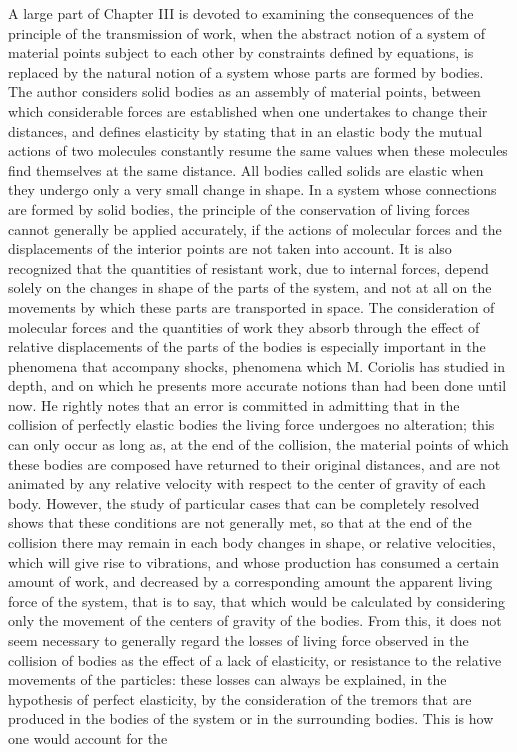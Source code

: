 \documentclass{book}
\begin{document}
A large part of Chapter III is devoted to examining the consequences of the principle of the transmission of work, when the abstract notion of a system of material points subject to each other by constraints defined by equations, is replaced by the natural notion of a system whose parts are formed by bodies. The author considers solid bodies as an assembly of material points, between which considerable forces are established when one undertakes to change their distances, and defines elasticity by stating that in an elastic body the mutual actions of two molecules constantly resume the same values when these molecules find themselves at the same distance. All bodies called solids are elastic when they undergo only a very small change in shape. In a system whose connections are formed by solid bodies, the principle of the conservation of living forces cannot generally be applied accurately, if the actions of molecular forces and the displacements of the interior points are not taken into account. It is also recognized that the quantities of resistant work, due to internal forces, depend solely on the changes in shape of the parts of the system, and not at all on the movements by which these parts are transported in space. The consideration of molecular forces and the quantities of work they absorb through the effect of relative displacements of the parts of the bodies is especially important in the phenomena that accompany shocks, phenomena which M. Coriolis has studied in depth, and on which he presents more accurate notions than had been done until now. He rightly notes that an error is committed in admitting that in the collision of perfectly elastic bodies the living force undergoes no alteration; this can only occur as long as, at the end of the collision, the material points of which these bodies are composed have returned to their original distances, and are not animated by any relative velocity with respect to the center of gravity of each body. However, the study of particular cases that can be completely resolved shows that these conditions are not generally met, so that at the end of the collision there may remain in each body changes in shape, or relative velocities, which will give rise to vibrations, and whose production has consumed a certain amount of work, and decreased by a corresponding amount the apparent living force of the system, that is to say, that which would be calculated by considering only the movement of the centers of gravity of the bodies. From this, it does not seem necessary to generally regard the losses of living force observed in the collision of bodies as the effect of a lack of elasticity, or resistance to the relative movements of the particles: these losses can always be explained, in the hypothesis of perfect elasticity, by the consideration of the tremors that are produced in the bodies of the system or in the surrounding bodies. This is how one would account for the 
\end{document}
